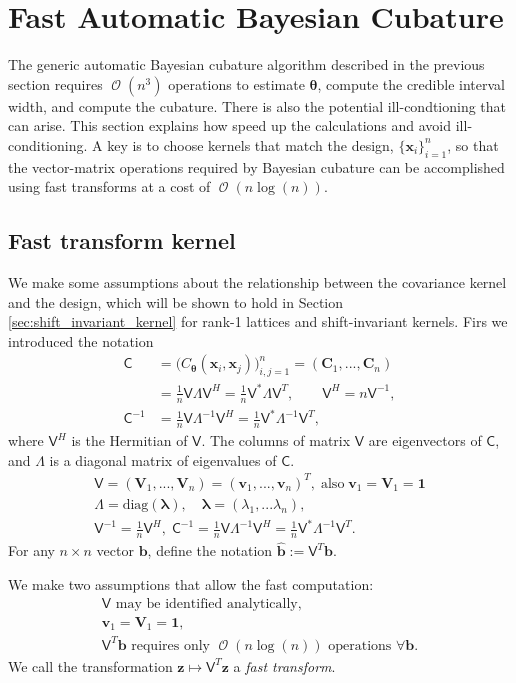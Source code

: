 \documentclass[twocolumn]{svjour3}          %
\DeclareMathOperator{\Order}{{\mathcal O}}
\newcommand{\bm}[1]{\boldsymbol{#1}}
\newcommand{\vlambda}{{\bm{\lambda}}}
\newcommand{\vtheta}{{\bm{\theta}}}
\newcommand{\vb}{\bm{b}}
\newcommand{\vC}{\bm{C}}
\newcommand{\vv}{\bm{v}}
\newcommand{\vV}{\bm{V}}
\newcommand{\vx}{\bm{x}}
\newcommand{\vz}{\bm{z}}
\newcommand{\vone}{\bm{1}}
\newcommand{\mC}{\mathsf{C}}
\newcommand{\mCInv}{{\mathsf{C}^{-1}}}
\newcommand{\mLambda}{\mathsf{\Lambda}}
\newcommand{\mV}{\mathsf{V}}
\newcommand{\diag}{\text{diag}}
\begin{document}
\section{Fast Automatic Bayesian Cubature}\label{sec:fast_BC}

The generic automatic Bayesian cubature algorithm described in the previous section requires $\Order(n^3)$ operations to estimate $\vtheta$, compute the credible interval width, and compute the cubature.  There is also the potential ill-condtioning that can arise.  This section explains how speed up the calculations and avoid ill-conditioning.  A key is to choose kernels that match the design, $\{\vx_i\}_{i=1}^n$, so that the vector-matrix operations required by Bayesian cubature can be accomplished using fast transforms at a cost of $\Order(n \log(n))$.

\subsection{Fast transform kernel}
We make some assumptions about the relationship between the covariance kernel and the design, which will be shown to hold in Section \ref{sec:shift_invariant_kernel} for rank-1 lattices and shift-invariant kernels.  Firs we introduced the notation
\begin{align}
\nonumber
\mC &= \Big(C_\vtheta(\vx_i,\vx_j)\Big)_{i,j=1}^n  = (\vC_1,...,\vC_n) 
\\
\label{eqn:ftk_factor}
&= \frac 1n \mV \mLambda \mV^H  = \frac 1n \mV^* \mLambda \mV^T , 
\quad \quad \mV^H = n \mV^{-1}, \\
\nonumber
\mCInv  &= \frac 1n \mV \mLambda^{-1} \mV^H
= \frac 1n \mV^* \mLambda^{-1} \mV^T,
\end{align}
where $\mV^H$ is the Hermitian of $\mV$.  The columns of matrix $\mV$ are eigenvectors of $\mC$, and $\mLambda$ is a diagonal matrix of eigenvalues of $\mC$.
\begin{gather*}
\mV = (\vV_1,...,\vV_n)= (\vv_1,...,\vv_n)^T , \; \text{also} \;  \vv_1 = \vV_1 = \vone
\\
\mLambda = \diag(\vlambda), \quad 
\vlambda = (\lambda_1, ... \lambda_n),
\\
\mV^{-1} = \frac 1n \mV^H, \;
\mCInv  = \frac 1n \mV \mLambda^{-1} \mV^H
 = \frac 1n \mV^* \mLambda^{-1} \mV^T.
\end{gather*}
For any $n \times n$ vector $\vb$, define the notation  $\widehat{\vb} := \mV^T \vb$.

We make two assumptions that allow the fast computation:
\begin{subequations} \label{fastcompAssump}
	\begin{gather}
	\mV \text{ may be identified analytically}, \\
	\vv_1 = \vV_1 = \vone, \\
     \mV^T \vb  \text{ requires only $\Order(n \log(n))$ operations } \forall \vb.
	\end{gather}
\end{subequations}
We call the transformation $\vz \mapsto \mV^T \vz$ a \emph{fast transform}.  
\end{document}
